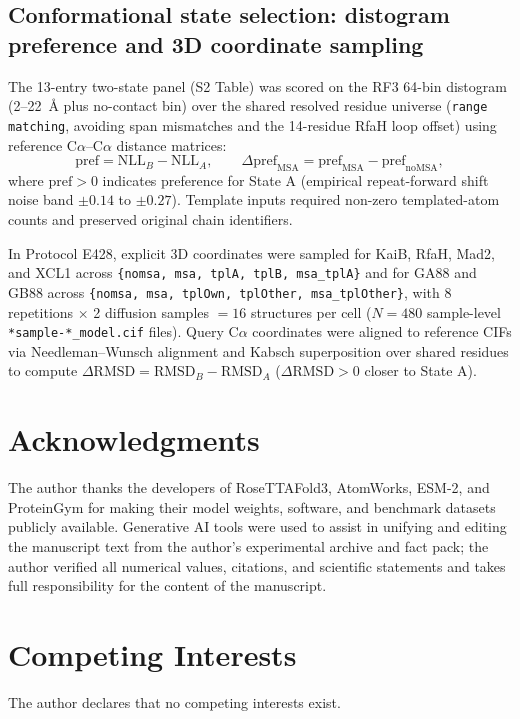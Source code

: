 \documentclass[10pt,a4paper]{article}
\begin{document}
\subsection{Conformational state selection: distogram preference and 3D coordinate sampling}
The 13-entry two-state panel (S2 Table) was scored on the RF3 64-bin distogram (2--22~\AA{} plus no-contact bin) over the shared resolved residue universe (\texttt{range matching}, avoiding span mismatches and the 14-residue RfaH loop offset) using reference C$\alpha$--C$\alpha$ distance matrices:
\begin{equation}
    \mathrm{pref} = \mathrm{NLL}_B - \mathrm{NLL}_A, \qquad \Delta\mathrm{pref}_{\mathrm{MSA}} = \mathrm{pref}_{\mathrm{MSA}} - \mathrm{pref}_{\mathrm{noMSA}},
\end{equation}
where $\mathrm{pref} > 0$ indicates preference for State A (empirical repeat-forward shift noise band $\pm 0.14$ to $\pm 0.27$). Template inputs required non-zero templated-atom counts and preserved original chain identifiers.

In Protocol E428, explicit 3D coordinates were sampled for KaiB, RfaH, Mad2, and XCL1 across \texttt{\{nomsa, msa, tplA, tplB, msa\_tplA\}} and for GA88 and GB88 across \texttt{\{nomsa, msa, tplOwn, tplOther, msa\_tplOther\}}, with 8 repetitions $\times$ 2 diffusion samples $= 16$ structures per cell ($N=480$ sample-level \texttt{*sample-*\_model.cif} files). Query C$\alpha$ coordinates were aligned to reference CIFs via Needleman--Wunsch alignment and Kabsch superposition over shared residues to compute $\Delta\mathrm{RMSD} = \mathrm{RMSD}_B - \mathrm{RMSD}_A$ ($\Delta\mathrm{RMSD} > 0$ closer to State A).

\section*{Acknowledgments}
The author thanks the developers of RoseTTAFold3, AtomWorks, ESM-2, and ProteinGym for making their model weights, software, and benchmark datasets publicly available. Generative AI tools were used to assist in unifying and editing the manuscript text from the author's experimental archive and fact pack; the author verified all numerical values, citations, and scientific statements and takes full responsibility for the content of the manuscript.

\section*{Competing Interests}
The author declares that no competing interests exist.
\end{document}
